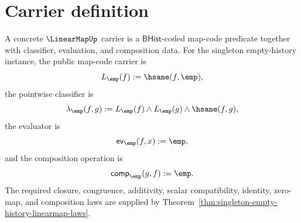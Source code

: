 \section{Carrier definition}

\begin{definition}
\label{def:linearmap-carrier}
A concrete $\LinearMapUp$ carrier is a $\mathsf{BHist}$-coded map-code
predicate together with classifier, evaluation, and composition data. For the
singleton empty-history instance, the public map-code carrier is
$$
L_{\emp}(f):=\hsame(f,\emp),
$$
the pointwise classifier is
$$
\lambda_{\emp}(f,g):=L_{\emp}(f)\land L_{\emp}(g)\land\hsame(f,g),
$$
the evaluator is
$$
\mathsf{ev}_{\emp}(f,x):=\emp,
$$
and the composition operation is
$$
\mathsf{comp}_{\emp}(g,f):=\emp.
$$
The required closure, congruence, additivity, scalar compatibility, identity,
zero-map, and composition laws are supplied by
Theorem~\ref{thm:singleton-empty-history-linearmap-laws}.
\end{definition}

